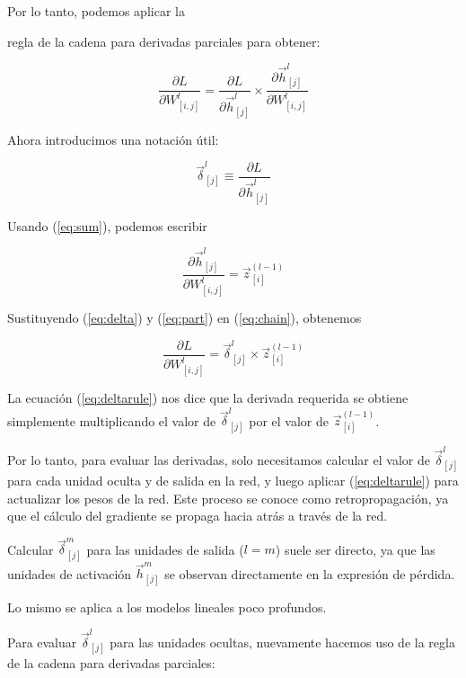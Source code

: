 Por lo tanto, podemos aplicar la

regla de la cadena para derivadas parciales para obtener:

\begin{equation}
\frac{\partial L}{\partial W_{[i,j]}^l} = \frac{\partial L}{\partial \vec{h}_{[j]}^{l}} \times \frac{\partial \vec{h}_{[j]}^{l}}{\partial W_{[i,j]}^l}
\label{eq:chain}
\end{equation}

Ahora introducimos una notación útil:

\begin{equation}
\vec{\delta}_{[j]}^l \equiv \frac{\partial L}{\partial \vec{h}_{[j]}^l}
\label{eq:delta}
\end{equation}

Usando (\ref{eq:sum}), podemos escribir

\begin{equation}
\frac{\partial \vec{h}_{[j]}^l}{\partial W_{[i,j]}^l} = \vec{z}_{[i]}^{(l-1)}
\label{eq:part}
\end{equation}

Sustituyendo (\ref{eq:delta}) y (\ref{eq:part}) en (\ref{eq:chain}), obtenemos

\begin{equation}
\frac{\partial L}{\partial W_{[i,j]}^l} = \vec{\delta}_{[j]}^l \times \vec{z}_{[i]}^{(l-1)}
\label{eq:deltarule}
\end{equation}

La ecuación (\ref{eq:deltarule}) nos dice que la derivada requerida se obtiene simplemente multiplicando el valor de $\vec{\delta}_{[j]}^l$ por el valor de $\vec{z}_{[i]}^{(l-1)}$.

Por lo tanto, para evaluar las derivadas, solo necesitamos calcular el valor de $\vec{\delta}_{[j]}^l$ para cada unidad oculta y de salida en la red, y luego aplicar (\ref{eq:deltarule}) para actualizar los pesos de la red. Este proceso se conoce como retropropagación, ya que el cálculo del gradiente se propaga hacia atrás a través de la red.


Calcular $\vec{\delta}_{[j]}^m$ para las unidades de salida ($l=m$) suele ser directo, ya que las unidades de activación $\vec{h}_{[j]}^m$ se observan directamente en la expresión de pérdida.

Lo mismo se aplica a los modelos lineales poco profundos.

Para evaluar $\vec{\delta}_{[j]}^l$ para las unidades ocultas, nuevamente hacemos uso de la regla de la cadena para derivadas parciales:

